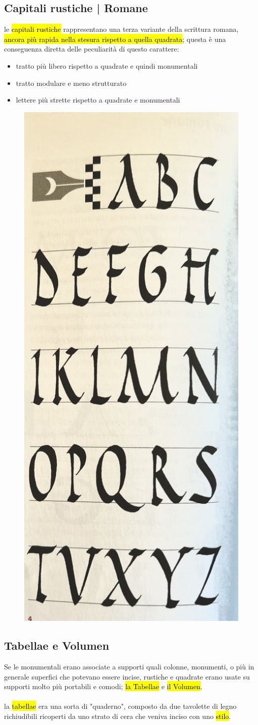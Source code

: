 \subsection{Capitali rustiche | Romane}
le \hl{capitali rustiche} rappresentano una terza variante della scrittura romana, \hl{ancora più rapida nella stesura rispetto a quella quadrata}; questa è una conseguenza diretta delle peculiarità di questo carattere:
\begin{itemize}
    \item tratto più libero rispetto a quadrate e quindi monumentali
    \item tratto modulare e meno strutturato
    \item lettere più strette rispetto a quadrate e monumentali
\end{itemize}
\begin{figure}[H]
    \centering
    \includegraphics[width=0.2\linewidth]{blocco_3 - storia della scrittura/imgs/cap_rustica.jpg}
\end{figure}

\subsection{Tabellae e Volumen}
Se le monumentali erano associate a supporti quali colonne, monumenti, o più in generale superfici che potevano essere incise, rustiche e quadrate erano usate su supporti molto più portabili e comodi; \hl{la Tabellae} e \hl{il Volumen}.
\\\\
la \hl{tabellae} era una sorta di "quaderno", composto da due tavolette di legno richiudibili ricoperti da uno strato di cera che veniva inciso con uno \hl{stilo}.

